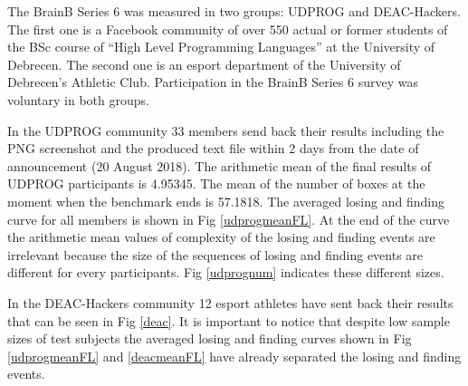 \documentclass[a4paper]{article}
\begin{document}
The BrainB Series 6 was measured in two groups: UDPROG and DEAC-Hackers.
The first one is a Facebook community of over 550 actual or former students of the BSc course of “High Level Programming Languages” at the University of Debrecen. 
The second one is an esport department of the University of Debrecen's Athletic Club. Participation in the BrainB Series 6 survey was voluntary in both groups. 

In the UDPROG community 33 members send back their results including the PNG screenshot and the produced text file 
within 2 days from the date of announcement (20 August 2018). 
The arithmetic mean of the final results of UDPROG participants is 4.95345. 
The mean of the number of boxes at the moment when the benchmark ends is 57.1818.
The averaged losing and finding curve for all members is shown in Fig \ref{udprogmeanFL}.
At the end of the curve the arithmetic mean values of complexity of the losing and finding events are irrelevant because the size of the sequences of losing and finding events 
are different for every participants. Fig \ref{udprognum} indicates these different sizes.

In the DEAC-Hackers community 12 esport athletes have sent back their results that can be seen in Fig \ref{deac}. 
It is important to notice that despite low sample sizes of test subjects the averaged losing and finding 
curves shown in Fig \ref{udprogmeanFL} and \ref{deacmeanFL} have already separated the losing and finding events.


\end{document}
